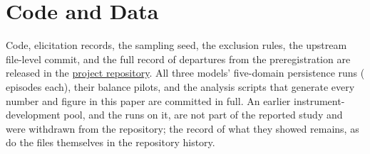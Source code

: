 \section*{Code and Data}
\label{sec:code}

Code, elicitation records, the sampling seed, the exclusion rules, the upstream
file-level commit, and the full record of departures from the preregistration are
released in the
\href{https://github.com/melanieyes/Do-Model-Preferences-Persist-Under-Challenge}{project
repository}. All three models'
five-domain persistence runs (\pqxNEpisodes{} episodes each), their balance pilots, and
the analysis scripts that generate every number and figure in this paper are committed in
full. An earlier instrument-development pool, and the runs on it, are not part of the
reported study and were withdrawn from the repository; the record of what they showed
remains, as do the files themselves in the repository history.
